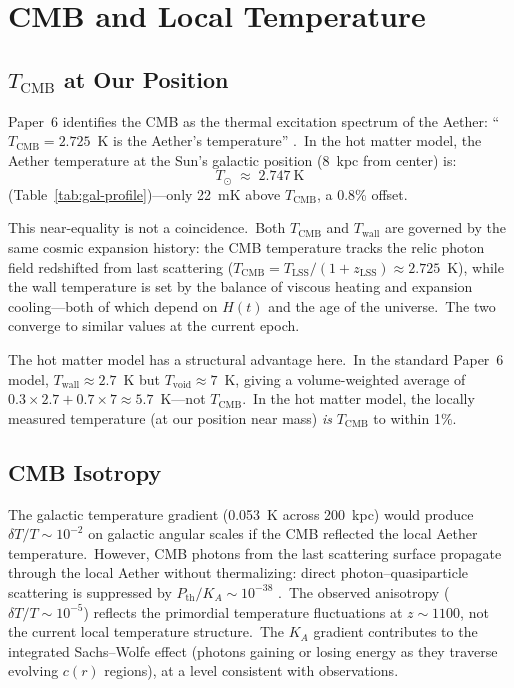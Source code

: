 \documentclass[12pt,letterpaper]{article}
\newcommand{\Ka}{K_{\!A}}
\begin{document}
\section{CMB and Local Temperature}
\label{sec:cmb}

\subsection{\texorpdfstring{$T_{\mathrm{CMB}}$}{T\_CMB} at Our Position}

Paper~6 identifies the CMB as the thermal excitation spectrum of the Aether:
``$T_{\mathrm{CMB}} = 2.725$~K is the Aether's temperature''
\cite{otto-cosmology}.\ In the hot matter model, the Aether temperature
at the Sun's galactic position (8~kpc from center) is:
%
\begin{equation}
  T_\odot \;\approx\; 2.747~\text{K}
  \label{eq:Tsun}
\end{equation}
%
(Table~\ref{tab:gal-profile})---only 22~mK above $T_{\mathrm{CMB}}$, a
0.8\% offset.

This near-equality is not a coincidence.\ Both $T_{\mathrm{CMB}}$ and
$T_{\mathrm{wall}}$ are governed by the same cosmic expansion history:
the CMB temperature tracks the relic photon field redshifted from last
scattering ($T_{\mathrm{CMB}} = T_{\mathrm{LSS}}/(1 + z_{\mathrm{LSS}})
\approx 2.725$~K), while the wall temperature is set by the balance of
viscous heating and expansion cooling---both of which depend on $H(t)$ and
the age of the universe.\ The two converge to similar values at the current
epoch.

The hot matter model has a structural advantage here.\ In the standard
Paper~6 model, $T_{\mathrm{wall}} \approx 2.7$~K but
$T_{\mathrm{void}} \approx 7$~K, giving a volume-weighted average of
$0.3 \times 2.7 + 0.7 \times 7 \approx 5.7$~K---not $T_{\mathrm{CMB}}$.\
In the hot matter model, the locally measured temperature (at our position
near mass) \emph{is} $T_{\mathrm{CMB}}$ to within 1\%.


\subsection{CMB Isotropy}

The galactic temperature gradient (0.053~K across 200~kpc) would produce
$\delta T/T \sim 10^{-2}$ on galactic angular scales if the CMB reflected
the local Aether temperature.\ However, CMB photons from the last scattering
surface propagate through the local Aether without thermalizing: direct
photon--quasiparticle scattering is suppressed by
$P_{\mathrm{th}}/\Ka \sim 10^{-38}$ \cite{otto-cosmology}.\ The observed
anisotropy ($\delta T/T \sim 10^{-5}$) reflects the primordial temperature
fluctuations at $z \sim 1100$, not the current local temperature structure.\
The $\Ka$ gradient contributes to the integrated Sachs--Wolfe effect
(photons gaining or losing energy as they traverse evolving $c(r)$ regions),
at a level consistent with observations.
\end{document}

